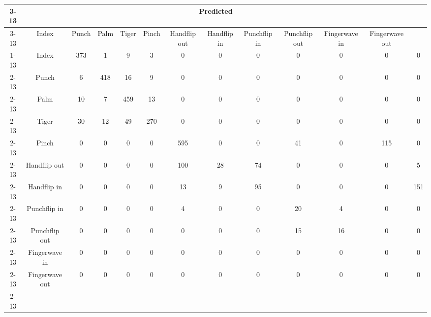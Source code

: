 \documentclass{standalone}
\begin{document}
 
 \begin{tabular}{|c |c |c |c |c |c |c |c |c |c |c |c |c |}
\cline{3-13}\multicolumn{2}{c|}{} & \multicolumn{11}{c|}{Predicted} \\ 
\cline{3-13} \multicolumn{2}{c |}{ } & Index & Punch & Palm & Tiger & Pinch & Handflip out & Handflip in & Punchflip in & Punchflip out & Fingerwave in & Fingerwave out\\ 
\cline{1-13}\multirow{11}{*}{\rotatebox[origin=c]{90}{Actual}} & Index & 373 & 1 & 9 & 3 & 0 & 0 & 0 & 0 & 0 & 0 & 0\\ 
 \cline{2-13} & Punch & 6 & 418 & 16 & 9 & 0 & 0 & 0 & 0 & 0 & 0 & 0\\ 
 \cline{2-13} & Palm & 10 & 7 & 459 & 13 & 0 & 0 & 0 & 0 & 0 & 0 & 0\\ 
 \cline{2-13} & Tiger & 30 & 12 & 49 & 270 & 0 & 0 & 0 & 0 & 0 & 0 & 0\\ 
 \cline{2-13} & Pinch & 0 & 0 & 0 & 0 & 595 & 0 & 0 & 41 & 0 & 115 & 0\\ 
 \cline{2-13} & Handflip out & 0 & 0 & 0 & 0 & 100 & 28 & 74 & 0 & 0 & 0 & 5\\ 
 \cline{2-13} & Handflip in & 0 & 0 & 0 & 0 & 13 & 9 & 95 & 0 & 0 & 0 & 151\\ 
 \cline{2-13} & Punchflip in & 0 & 0 & 0 & 0 & 4 & 0 & 0 & 20 & 4 & 0 & 0\\ 
 \cline{2-13} & Punchflip out & 0 & 0 & 0 & 0 & 0 & 0 & 0 & 15 & 16 & 0 & 0\\ 
 \cline{2-13} & Fingerwave in & 0 & 0 & 0 & 0 & 0 & 0 & 0 & 0 & 0 & 0 & 0\\ 
 \cline{2-13} & Fingerwave out & 0 & 0 & 0 & 0 & 0 & 0 & 0 & 0 & 0 & 0 & 0\\ 
 \cline{2-13}\hline \end{tabular}
 
\end{document}
